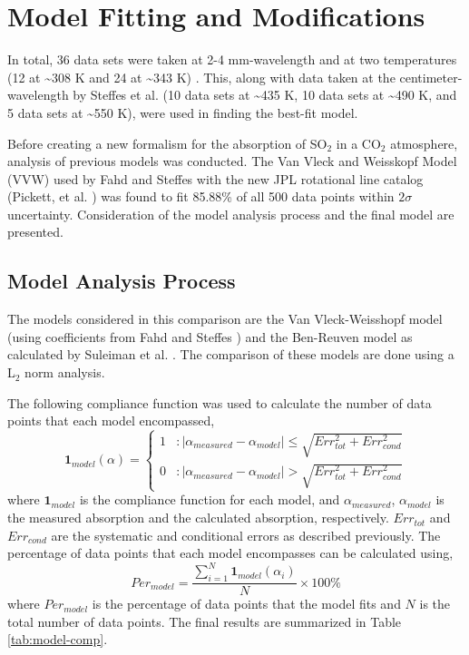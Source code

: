 \chapter{Model Fitting and Modifications}
In total, 36 data sets were taken at 2-4 mm-wavelength and at two temperatures (12 at \textasciitilde 308 K and 24 at \textasciitilde 343 K) . This, along with data taken at the centimeter-wavelength by Steffes et al. \cite{Steffes-2014} (10 data sets at \textasciitilde 435 K, 10 data sets at \textasciitilde 490 K, and 5 data sets at \textasciitilde 550 K), were used in finding the best-fit model.

Before creating a new formalism for the absorption of SO$_2$ in a CO$_2$ atmosphere, analysis of previous models was conducted. The Van Vleck and Weisskopf Model (VVW) used by Fahd and Steffes \cite{Fahd-1991} with the new JPL rotational line catalog (Pickett, et al. \cite{Pickett-1998}) was found to fit 85.88\% of all 500 data points within $2\sigma$ uncertainty. Consideration of the model analysis process and the final model are presented.


\section{Model Analysis Process}

The models considered in this comparison are the Van Vleck-Weisshopf model (using coefficients from Fahd and Steffes \cite{Fahd-1991}) and the Ben-Reuven model as calculated by Suleiman et al. \cite{Suleiman-1996}. The comparison of these models are done using a L$_2$ norm analysis. 

The following compliance function was used to calculate the number of data points that each model encompassed,
\begin{equation}
\textbf{1}_{model}(\alpha) = \left\{
     \begin{array}{lr}
       1 & : |\alpha_{measured} - \alpha_{model}| \leq \sqrt{Err_{tot}^2 + Err_{cond}^2 }\\
       0 & : |\alpha_{measured} - \alpha_{model}| > \sqrt{Err_{tot}^2 + Err_{cond}^2 }
     \end{array}
   \right.
\end{equation}
where $\textbf{1}_{model}$ is the compliance function for each model, and $\alpha_{measured}$, $\alpha_{model}$ is the measured absorption and the calculated absorption, respectively. $Err_{tot}$ and $Err_{cond}$ are the systematic and conditional errors as described previously. The percentage of data points that each model encompasses can be calculated using,
\begin{equation}
Per_{model} = \frac{\sum_{i=1}^N \textbf{1}_{model}(\alpha_i)}{N}\times 100\%
\end{equation}
where $Per_{model}$ is the percentage of data points that the model fits and $N$ is the total number of data points. The final results are summarized in Table \ref{tab:model-comp}.

